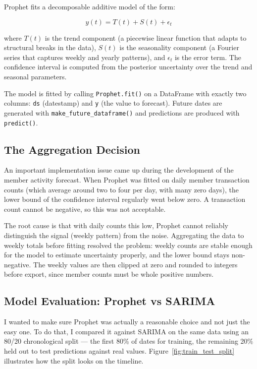 \documentclass[12pt, a4paper]{report}
\begin{document}
Prophet fits a decomposable additive model of the form:

\[
  y(t) = T(t) + S(t) + \epsilon_t
\]

where $T(t)$ is the trend component (a piecewise linear function that adapts to
structural breaks in the data), $S(t)$ is the seasonality component (a Fourier
series that captures weekly and yearly patterns), and $\epsilon_t$ is the error
term. The confidence interval is computed from the posterior uncertainty over the
trend and seasonal parameters.

The model is fitted by calling \texttt{Prophet.fit()} on a DataFrame with exactly
two columns: \texttt{ds} (datestamp) and \texttt{y} (the value to forecast). Future
dates are generated with \texttt{make\_future\_dataframe()} and predictions are
produced with \texttt{predict()}.

\subsection{The Aggregation Decision}

An important implementation issue came up during the development of the member
activity forecast. When Prophet was fitted on daily member transaction counts (which average around
two to four per day, with many zero days), the lower bound of the confidence
interval regularly went below zero. A transaction count cannot be
negative, so this was not acceptable.

The root cause is that with daily counts this low, Prophet cannot reliably
distinguish the signal (weekly pattern) from the noise. Aggregating the data to
weekly totals before fitting resolved the problem: weekly counts are stable enough
for the model to estimate uncertainty properly, and the lower bound stays
non-negative. The weekly values are then clipped at zero and rounded to integers
before export, since member counts must be whole positive numbers.

\subsection{Model Evaluation: Prophet vs SARIMA}

I wanted to make sure Prophet was actually a reasonable choice and not just
the easy one. To do that, I compared it against SARIMA on the same data using
an 80/20 chronological split --- the first 80\% of dates for training, the
remaining 20\% held out to test predictions against real values.
Figure~\ref{fig:train_test_split} illustrates how the split looks on the timeline.
\end{document}
